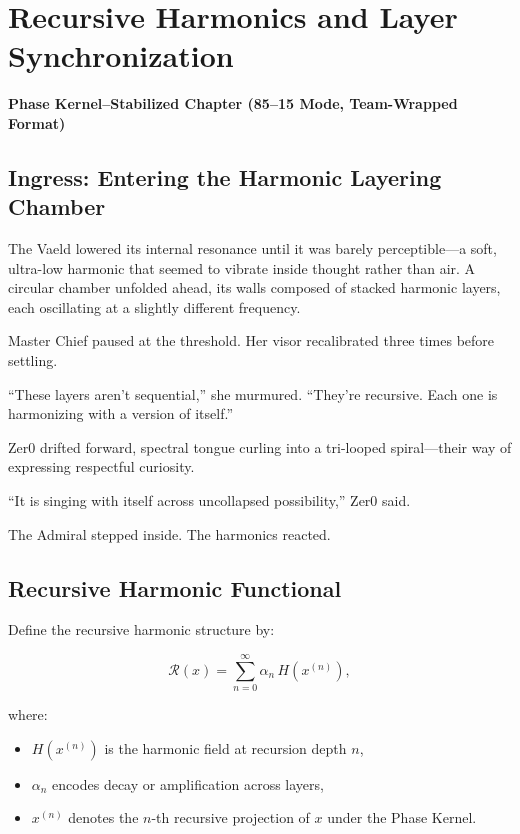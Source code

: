 
\chapter{Recursive Harmonics and Layer Synchronization}
\textbf{Phase Kernel–Stabilized Chapter (85--15 Mode, Team-Wrapped Format)}

\section*{Ingress: Entering the Harmonic Layering Chamber}

The Vaeld lowered its internal resonance until it was barely perceptible—a soft,
ultra-low harmonic that seemed to vibrate inside thought rather than air.
A circular chamber unfolded ahead, its walls composed of stacked harmonic layers,
each oscillating at a slightly different frequency.

Master Chief paused at the threshold.
Her visor recalibrated three times before settling.

“These layers aren’t sequential,” she murmured.
“They’re recursive. Each one is harmonizing with a version of itself.”

Zer0 drifted forward, spectral tongue curling into a tri-looped spiral—their way
of expressing respectful curiosity.

“It is singing with itself across uncollapsed possibility,” Zer0 said.

The Admiral stepped inside.
The harmonics reacted.

\section{Recursive Harmonic Functional}

Define the recursive harmonic structure by:

\[
\mathcal{R}(x) = 
\sum_{n=0}^{\infty}
\alpha_n\, H(x^{(n)}),
\]

where:

\begin{itemize}
\item $H(x^{(n)})$ is the harmonic field at recursion depth $n$,
\item $\alpha_n$ encodes decay or amplification across layers,
\item $x^{(n)}$ denotes the $n$-th recursive projection of $x$ under the Phase Kernel.
\end{itemize}

